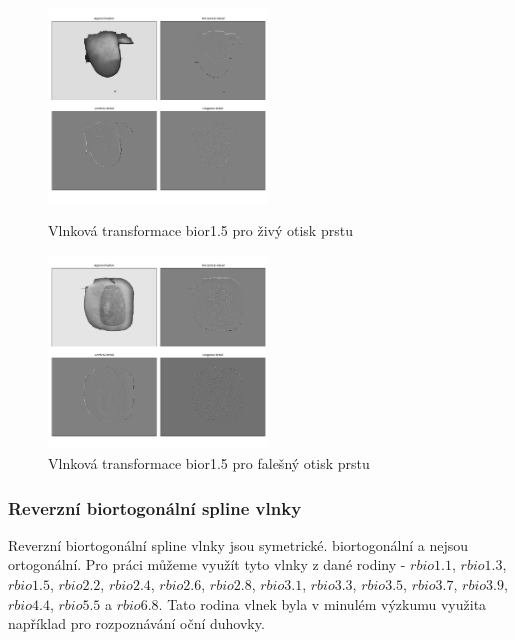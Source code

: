 \begin{figure}[!htbp]
  \begin{minipage}[b]{0.5\linewidth}
    \centering
    \includegraphics[width=220px]{obrazky-figures/Images14bior15mean.png}
    \caption{Vlnková transformace bior1.5 pro živý otisk prstu}
  \end{minipage}
  \hspace{0.5cm}
  \begin{minipage}[b]{0.5\linewidth}
    \centering
    \includegraphics[width=220px]{obrazky-figures/fake21otsubior15.png}
    \caption{Vlnková transformace bior1.5 pro falešný otisk prstu}
  \end{minipage}
\end{figure}



\subsubsection{Reverzní biortogonální spline vlnky}
Reverzní biortogonální spline vlnky jsou symetrické. biortogonální a nejsou ortogonální. Pro práci můžeme využít tyto vlnky z dané rodiny - $rbio1.1$, $rbio1.3$, $rbio1.5$, $rbio2.2$, $rbio2.4$, $rbio2.6$, $rbio2.8$, $rbio3.1$, $rbio3.3$, $rbio3.5$, $rbio3.7$, $rbio3.9$, $rbio4.4$, $rbio 5.5$ a $rbio6.8$.\cite{PyWaveletsBrowser} Tato rodina vlnek byla v minulém výzkumu využita například pro rozpoznávání oční duhovky.\cite{IrisRecognition}\\\\

